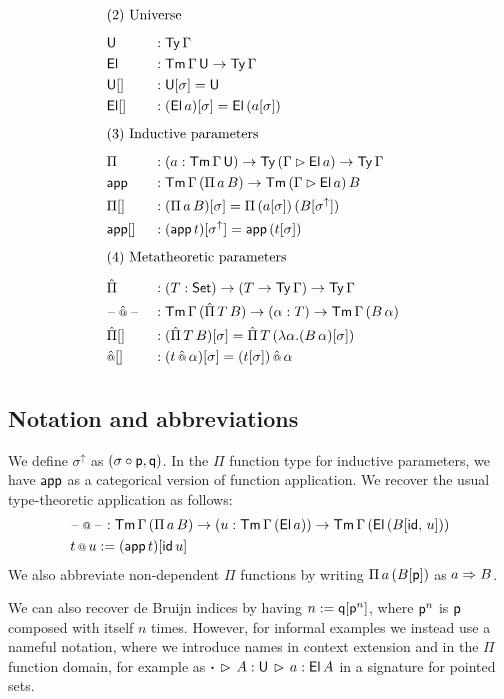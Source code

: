 \documentclass[a4paper,UKenglish,cleveref, autoref]{lipics-v2019}
\begin{document}
\begin{alignat*}{5}
  & \rlap{(2) Universe} \\[0.5em]
  & \U && : \Ty\,\Gamma \\
  & \El && : \Tm\,\Gamma\,\U\ra\Ty\,\Gamma \\
  & {\U[]} && : \U[\sigma] = \U \\
  & {\El[]} && : (\El\,a)[\sigma] = \El\,(a[\sigma]) \\[0.5em]
  & \rlap{(3) Inductive parameters} \\[0.5em]
  & \Pi && : (a:\Tm\,\Gamma\,\U)\ra\Ty\,(\Gamma\ext\El\,a)\ra\Ty\,\Gamma \\
  & \app && : \Tm\,\Gamma\,(\Pi\,a\,B)\ra\Tm\,(\Gamma\ext \El\,a)\,B \\
  & {\Pi[]} && : (\Pi\,a\,B)[\sigma] = \Pi\,(a[\sigma])\,(B[\sigma^\uparrow]) \\
  & {\app[]} && : (\app\,t)[\sigma^\uparrow] = \app\,(t[\sigma]) \\[0.5em]
  & \rlap{(4) Metatheoretic parameters} \\[0.5em]
  & \Pim && : (T:\Set)\ra(T\ra\Ty\,\Gamma)\ra\Ty\,\Gamma \\
  & \blank\appm \blank && : \Tm\,\Gamma\,(\Pim\,T\,B)\ra(\alpha:T) \ra\Tm\,\Gamma\,(B\,\alpha) \\
  & {\Pim[]} && : (\Pim\,T\,B)[\sigma] = \Pim\,T\,(\lambda \alpha.(B\,\alpha)[\sigma]) \\
  & {\appm[]} && : (t\appm\alpha)[\sigma] = (t[\sigma])\mathop{\appm}\alpha \\[0.5em]
\end{alignat*}
\subsection{Notation and abbreviations}

We define $\sigma^\uparrow$ as $(\sigma\circ\mathsf{p},\mathsf{q})$. In the $\Pi$ function type
for inductive parameters, we have $\mathsf{app}$ as a categorical version of function
application. We recover the usual type-theoretic application as follows:
\begin{alignat*}{5}
  & \mathord{\hspace{1pt}\text{--}\hspace{1pt}}\mathop{{\scriptstyle @}}\mathord{\hspace{1pt}\text{--}\hspace{1pt}} : \mathsf{Tm}\,\Gamma\,(\Pi\,a\,B)\rightarrow (u : \mathsf{Tm}\,\Gamma\,(\mathsf{El}\,a))
  \rightarrow \mathsf{Tm}\,\Gamma\,(\mathsf{El}\,(B[\mathsf{id},\,u])) \\
  & t \mathop{{\scriptstyle @}} u := (\mathsf{app}\,t)[\mathsf{id}\,u]
\end{alignat*}
We also abbreviate non-dependent $\Pi$ functions by writing $\Pi\,a\,(B[\mathsf{p}])$ as $a\Rightarrow B$.

We can also recover de Bruijn indices by having $n := \mathsf{q}[\mathsf{p}^n]$, where $\mathsf{p}^n$ is
$\mathsf{p}$ composed with itself $n$ times. However, for informal examples we instead
use a nameful notation, where we introduce names in context extension and in the
$\Pi$ function domain, for example as $\boldsymbol{\cdot}\,\rhd\,A : \mathsf{U}\,\rhd\,a :
\mathsf{El}\,A$ in a signature for pointed sets.
\end{document}
